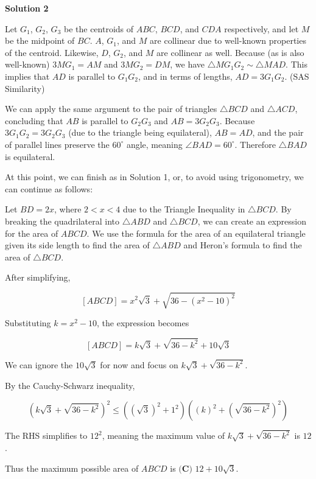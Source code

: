 \begin{enumerate}
 



\textbf{Solution 2}

Let $G_1$, $G_2$, $G_3$ be the centroids of $ABC$, $BCD$, and $CDA$ respectively, and let $M$ be the midpoint of $BC$. $A$, $G_1$, and $M$ are collinear due to well-known properties of the centroid. Likewise, $D$, $G_2$, and $M$ are collinear as well. Because (as is also well-known) $3MG_1 = AM$ and $3MG_2 = DM$, we have $\triangle MG_1G_2\sim\triangle MAD$. This implies that $AD$ is parallel to $G_1G_2$, and in terms of lengths, $AD = 3G_1G_2$. (SAS Similarity)

 We can apply the same argument to the pair of triangles $\triangle BCD$ and $\triangle ACD$, concluding that $AB$ is parallel to $G_2G_3$ and $AB = 3G_2G_3$. Because $3G_1G_2 = 3G_2G_3$ (due to the triangle being equilateral), $AB = AD$, and the pair of parallel lines preserve the $60^{\circ}$ angle, meaning $\angle BAD = 60^\circ$. Therefore $\triangle BAD$ is equilateral.

 At this point, we can finish as in Solution 1, or, to avoid using trigonometry, we can continue as follows:

 Let $BD = 2x$, where $2 < x < 4$ due to the Triangle Inequality in $\triangle BCD$. By breaking the quadrilateral into $\triangle ABD$ and $\triangle BCD$, we can create an expression for the area of $ABCD$. We use the formula for the area of an equilateral triangle given its side length to find the area of $\triangle ABD$ and Heron's formula to find the area of $\triangle BCD$.

 After simplifying,

 
 \[[ABCD] = x^2\sqrt 3 + \sqrt{36 - (x^2-10)^2}\]

 Substituting $k = x^2 - 10$, the expression becomes

 
 \[[ABCD] = k\sqrt{3} + \sqrt{36 - k^2} + 10\sqrt{3}\]

 We can ignore the $10\sqrt{3}$ for now and focus on $k\sqrt{3} + \sqrt{36 - k^2}$.

 By the Cauchy-Schwarz inequality,

 
 \[\left(k\sqrt 3 + \sqrt{36-k^2}\right)^2 \leq \left(\left(\sqrt{3}\right)^2+1^2\right)\left(\left(k\right)^2 + \left(\sqrt{36-k^2}\right)^2\right)\]

 The RHS simplifies to $12^2$, meaning the maximum value of $k\sqrt{3} + \sqrt{36 - k^2}$ is $12$.

 Thus the maximum possible area of $ABCD$ is $\boxed{\textbf{(C) }12 + 10\sqrt{3}}$.


\end{enumerate}
